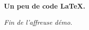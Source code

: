 
\begin{bdocshowcase}
    \bfseries Un peu de code \LaTeX.

    \bigskip

    \emph{\large Fin de l'affreuse démo.}
\end{bdocshowcase}